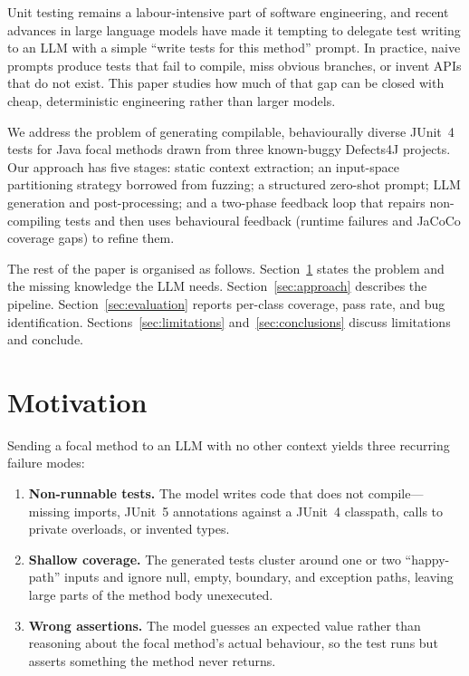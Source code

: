 \documentclass[conference]{IEEEtran}
\begin{document}
Unit testing remains a labour-intensive part of software engineering,
and recent advances in large language models have made it tempting to
delegate test writing to an LLM with a simple ``write tests for this
method'' prompt. In practice, naive prompts produce tests that fail to
compile, miss obvious branches, or invent APIs that do not exist. This
paper studies how much of that gap can be closed with cheap,
deterministic engineering rather than larger models.

We address the problem of generating compilable, behaviourally diverse
JUnit~4 tests for Java focal methods drawn from three known-buggy
Defects4J projects. Our approach has five stages: static
context extraction; an input-space partitioning strategy borrowed
from fuzzing; a structured zero-shot prompt; LLM generation and
post-processing; and a two-phase feedback loop that repairs
non-compiling tests and then uses behavioural feedback (runtime
failures and JaCoCo coverage gaps) to refine them.

The rest of the paper is organised as follows. Section~\ref{sec:motivation}
states the problem and the missing knowledge the LLM needs.
Section~\ref{sec:approach} describes the pipeline.
Section~\ref{sec:evaluation} reports per-class coverage, pass rate, and
bug identification. Sections~\ref{sec:limitations}
and~\ref{sec:conclusions} discuss limitations and conclude.

\section{Motivation}
\label{sec:motivation}

Sending a focal method to an LLM with no other context yields three
recurring failure modes:
\begin{enumerate}
  \item \textbf{Non-runnable tests.} The model writes code that does
        not compile---missing imports, JUnit~5 annotations against a
        JUnit~4 classpath, calls to private overloads, or invented
        types.
  \item \textbf{Shallow coverage.} The generated tests cluster around
        one or two ``happy-path'' inputs and ignore null, empty,
        boundary, and exception paths, leaving large parts of the
        method body unexecuted.
  \item \textbf{Wrong assertions.} The model guesses an expected value
        rather than reasoning about the focal method's actual
        behaviour, so the test runs but asserts something the method
        never returns.
\end{enumerate}
\end{document}
